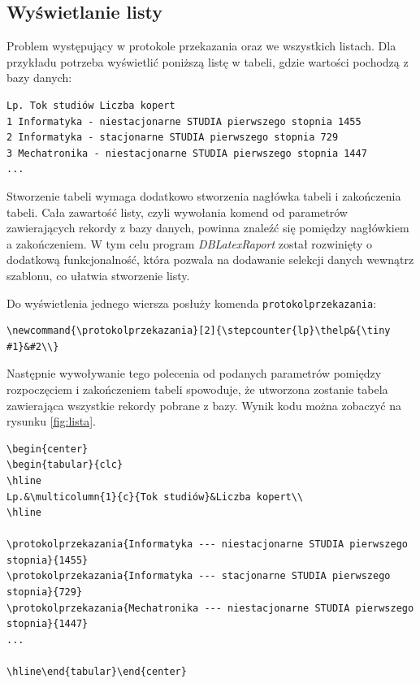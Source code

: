  \subsection{Wyświetlanie listy}
Problem występujący w protokole przekazania oraz we wszystkich listach. Dla przykładu potrzeba wyświetlić poniższą listę w tabeli, gdzie wartości pochodzą z bazy danych:
\begin{lstlisting}
Lp. Tok studiów Liczba kopert
1 Informatyka - niestacjonarne STUDIA pierwszego stopnia 1455
2 Informatyka - stacjonarne STUDIA pierwszego stopnia 729
3 Mechatronika - niestacjonarne STUDIA pierwszego stopnia 1447
...
\end{lstlisting}
\vspace{5mm}
\par
Stworzenie tabeli wymaga dodatkowo stworzenia nagłówka tabeli i zakończenia tabeli. Cała zawartość listy, czyli wywołania komend  od parametrów zawierających rekordy z bazy danych, powinna znaleźć się pomiędzy nagłówkiem a zakończeniem. W tym celu program \emph{DBLatexRaport} został rozwinięty o dodatkową funkcjonalność, która pozwala na dodawanie selekcji danych wewnątrz szablonu, co ułatwia stworzenie listy. 
\par
Do wyświetlenia jednego wiersza posłuży komenda \texttt{protokolprzekazania}:
\vspace{5mm}
\begin{lstlisting}
\newcommand{\protokolprzekazania}[2]{\stepcounter{lp}\thelp&{\tiny #1}&#2\\}
\end{lstlisting}
\vspace{3mm}
\par
Następnie wywoływanie tego polecenia od podanych parametrów pomiędzy rozpoczęciem i zakończeniem tabeli spowoduje, że utworzona zostanie tabela zawierająca wszystkie rekordy pobrane z bazy. Wynik kodu można zobaczyć na rysunku \ref{fig:lista}.
\begin{lstlisting}
\begin{center}
\begin{tabular}{clc}
\hline
Lp.&\multicolumn{1}{c}{Tok studiów}&Liczba kopert\\
\hline

\protokolprzekazania{Informatyka --- niestacjonarne STUDIA pierwszego stopnia}{1455}
\protokolprzekazania{Informatyka --- stacjonarne STUDIA pierwszego stopnia}{729}
\protokolprzekazania{Mechatronika --- niestacjonarne STUDIA pierwszego stopnia}{1447}
...

\hline\end{tabular}\end{center}
\end{lstlisting}


